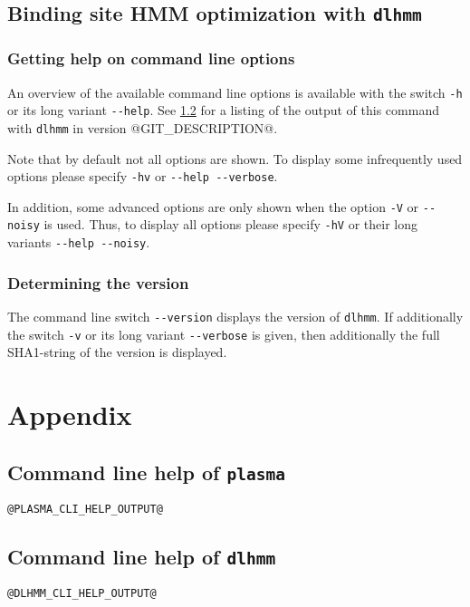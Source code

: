 \documentclass[a4paper]{article}
\makeatletter
\newcommand{\plasma}[0]{\texttt{plasma}}
\newcommand{\dlhmm}[0]{\texttt{dlhmm}}
\newcommand{\version}[0]{@GIT_DESCRIPTION@}
\makeatother
\begin{document}
\subsection{Binding site HMM optimization with \dlhmm{}}
\label{subsection:running-dlhmm}
\subsubsection{Getting help on command line options}
An overview of the available command line options is available with the switch \verb|-h| or its long variant \verb|--help|.
See \cref{appendix:dlhmm-cli-help} for a listing of the output of this command with \dlhmm{} in version \version{}.

Note that by default not all options are shown.
To display some infrequently used options please specify \verb|-hv| or \verb|--help --verbose|.

In addition, some advanced options are only shown when the option \verb|-V| or \verb|--noisy| is used.
Thus, to display all options please specify \verb|-hV| or their long variants \verb|--help --noisy|.

\subsubsection{Determining the version}
The command line switch \verb|--version| displays the version of \dlhmm{}.
If additionally the switch \verb|-v| or its long variant \verb|--verbose| is given, then additionally the full SHA1-string of the version is displayed.


\section{Appendix}
\subsection{Command line help of \plasma{}}
\label{appendix:plasma-cli-help}
\begin{verbatim}
@PLASMA_CLI_HELP_OUTPUT@
\end{verbatim}

\subsection{Command line help of \dlhmm{}}
\label{appendix:dlhmm-cli-help}
\begin{verbatim}
@DLHMM_CLI_HELP_OUTPUT@
\end{verbatim}



\nocite{*}
{}


\end{document}
